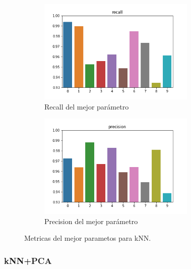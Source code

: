\documentclass[a4paper,10pt]{article}
\begin{document}
\begin{figure}[H]
\begin{subfigure}{0.5\textwidth}
\includegraphics[width=0.9\linewidth, height=5cm]{../images/recall_knn.png} 
\caption{Recall del mejor parámetro}
\end{subfigure}
\begin{subfigure}{0.5\textwidth}
\includegraphics[width=0.9\linewidth, height=5cm]{../images/precision_knn.png} 
\caption{Precision del mejor parámetro}
\end{subfigure}
\caption{Metricas del mejor parametos para kNN.}
\label{knn_metricas}%
\end{figure}





\subsubsection{kNN+PCA}
\end{document}
